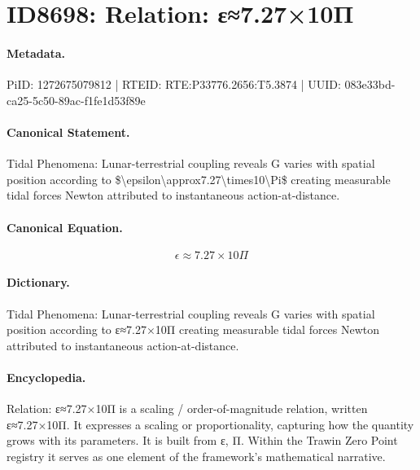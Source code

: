 \section*{ID8698: Relation: ε≈7.27×10Π}
\paragraph{Metadata.}
PiID: 1272675079812 | RTEID: RTE:P33776.2656:T5.3874 | UUID: 083e33bd-ca25-5c50-89ac-f1fe1d53f89e

\paragraph{Canonical Statement.}
Tidal Phenomena: Lunar-terrestrial coupling reveals G varies with spatial position according to \$\textbackslash{}epsilon\textbackslash{}approx7.27\textbackslash{}times10\textbackslash{}Pi\$ creating measurable tidal forces Newton attributed to instantaneous action-at-distance.

\paragraph{Canonical Equation.}
\[
\epsilon\approx7.27\times10\Pi
\]

\paragraph{Dictionary.}
Tidal Phenomena: Lunar-terrestrial coupling reveals G varies with spatial position according to ε≈7.27×10Π creating measurable tidal forces Newton attributed to instantaneous action-at-distance.

\paragraph{Encyclopedia.}
Relation: ε≈7.27×10Π is a scaling / order-of-magnitude relation, written ε≈7.27×10Π. It expresses a scaling or proportionality, capturing how the quantity grows with its parameters. It is built from ε, Π. Within the Trawin Zero Point registry it serves as one element of the framework's mathematical narrative.
